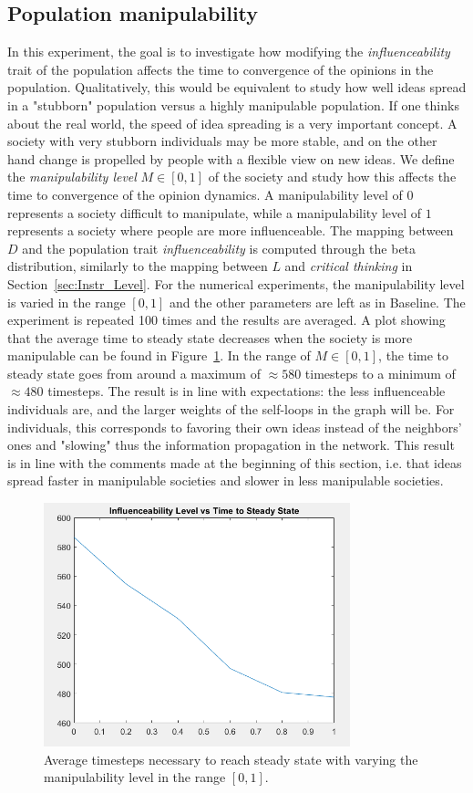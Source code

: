 \subsection{Population manipulability}
\label{sec:manipulability}
In this experiment, the goal is to investigate how modifying the \textit{influenceability} trait of the population affects the time to convergence of the opinions in the population. Qualitatively, this would be equivalent to study how well ideas spread in a "stubborn" population versus a highly manipulable population. If one thinks about the real world, the speed of idea spreading is a very important concept. A society with very stubborn individuals may be more stable, and on the other hand change is propelled by people with a flexible view on new ideas.
We define the \textit{manipulability level} $M \in [0,1]$ of the society and study how this affects the time to convergence of the opinion dynamics. A manipulability level of $0$ represents a society difficult to manipulate, while a manipulability level of $1$ represents a society where people are more influenceable. The mapping between $D$ and the population trait \textit{influenceability} is computed through the beta distribution, similarly to the mapping between $L$ and \textit{critical thinking} in Section~\ref{sec:Instr_Level}. For the numerical experiments, the manipulability level is varied in the range $[0,1]$ and the other parameters are left as in Baseline. The experiment is repeated 100 times and the results are averaged. A plot showing that the average time to steady state decreases when the society is more manipulable can be found in Figure~\ref{pics:man_steadystate}. In the range of $M\in [0,1]$, the time to steady state goes from around a maximum of $\approx 580$ timesteps to a minimum of $\approx 480$ timesteps. The result is in line with expectations: the less influenceable individuals are, and the larger weights of the self-loops in the graph will be. For individuals, this corresponds to favoring their own ideas instead of the neighbors' ones and "slowing" thus the information propagation in the network.
This result is in line with the comments made at the beginning of this section, i.e. that ideas spread faster in manipulable societies and slower in less manipulable societies.
\begin{figure}[!t]
	\centering
	\includegraphics[width=3.5in]{Figures/Exp8_2.png}
	\caption{Average timesteps necessary to reach steady state with varying the manipulability level in the range $[0,1]$.}
\label{pics:man_steadystate}
\end{figure}


